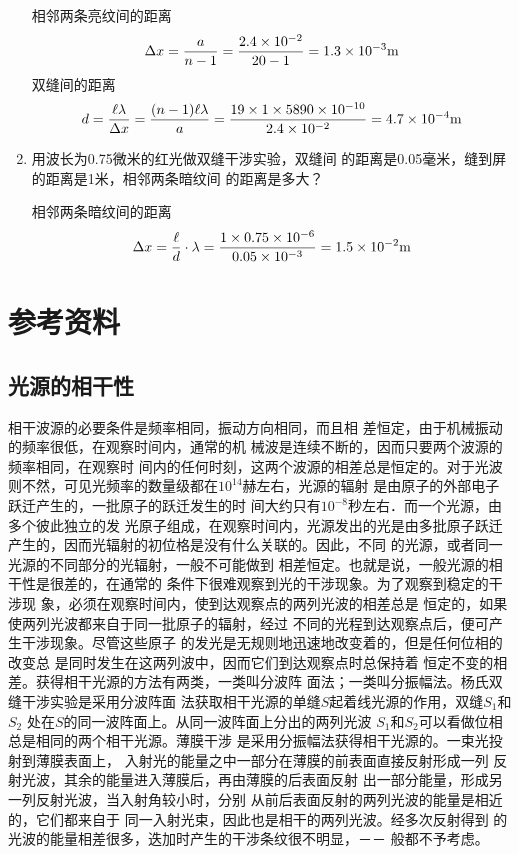 \begin{enumerate}
    \begin{solution}
相邻两条亮纹间的距离
\[\Delta x=\frac{a}{n-1}=\frac{2.4\times 10^{-2}}{20-1}=1.3\times 10^{-3}{\rm m}\]
双缝间的距离
\[d=\frac{\ell \lambda}{\Delta x}=\frac{(n-1)\ell\lambda}{a}=\frac{19\times 1\times 5890\times 10^{-10}}{2.4\times 10^{-2}}=4.7\times 10^{-4}{\rm m}\]
    \end{solution}
    
    \item 用波长为0.75微米的红光做双缝干涉实验，双缝间
    的距离是0.05毫米，缝到屏的距离是1米，相邻两条暗纹间
    的距离是多大？


    \begin{solution}
相邻两条暗纹间的距离
\[\Delta x=\frac{\ell }{d}\cdot\lambda=\frac{1\times 0.75\times 10^{-6}}{0.05\times 10^{-3}}=1.5\times 10^{-2}{\rm m}\]
    \end{solution}
    
\end{enumerate}

\section{参考资料}
\subsection{光源的相干性}
相干波源的必要条件是频率相同，振动方向相同，而且相
差恒定，由于机械振动的频率很低，在观察时间内，通常的机
械波是连续不断的，因而只要两个波源的频率相同，在观察时
间内的任何时刻，这两个波源的相差总是恒定的。对于光波
则不然，可见光频率的数量级都在$10^{14}$赫左右，光源的辐射
是由原子的外部电子跃迁产生的，一批原子的跃迁发生的时
间大约只有$10^{-8}$秒左右．而一个光源，由多个彼此独立的发
光原子组成，在观察时间内，光源发出的光是由多批原子跃迁
产生的，因而光辐射的初位格是没有什么关联的。因此，不同
的光源，或者同一光源的不同部分的光辐射，一般不可能做到
相差恒定。也就是说，一般光源的相干性是很差的，在通常的
条件下很难观察到光的干涉现象。为了观察到稳定的干涉现
象，必须在观察时间内，使到达观察点的两列光波的相差总是
恒定的，如果使两列光波都来自于同一批原子的辐射，经过
不同的光程到达观察点后，便可产生干涉现象。尽管这些原子
的发光是无规则地迅速地改变着的，但是任何位相的改变总
是同时发生在这两列波中，因而它们到达观察点时总保持着
恒定不变的相差。获得相干光源的方法有两类，一类叫分波阵
面法；一类叫分振幅法。杨氏双缝干涉实验是采用分波阵面
法获取相干光源的单缝$S$起着线光源的作用，双缝$S_1$和$S_2$
处在$S$的同一波阵面上。从同一波阵面上分出的两列光波
$S_1$和$S_2$可以看做位相总是相同的两个相干光源。薄膜干涉
是采用分振幅法获得相干光源的。一束光投射到薄膜表面上，
入射光的能量之中一部分在薄膜的前表面直接反射形成一列
反射光波，其余的能量进入薄膜后，再由薄膜的后表面反射
出一部分能量，形成另一列反射光波，当入射角较小时，分别
从前后表面反射的两列光波的能量是相近的，它们都来自于
同一入射光束，因此也是相干的两列光波。经多次反射得到
的光波的能量相差很多，迭加时产生的干涉条纹很不明显，－－
般都不予考虑。

